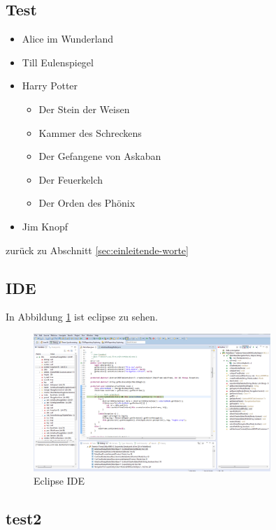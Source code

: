 \documentclass[12pt]{scrartcl}
\begin{document}
\subsection{Test}

\begin{itemize}
  \item Alice im Wunderland
  \item Till Eulenspiegel
  \item Harry Potter
  \begin{itemize}
    \item Der Stein der Weisen
    \item Kammer des Schreckens
    \item Der Gefangene von Askaban
    \item Der Feuerkelch
    \item Der Orden des Phönix
  \end{itemize}
  \item Jim Knopf
\end{itemize}

zurück zu Abschnitt \ref{sec:einleitende-worte}

\subsection{IDE}

In Abbildung \ref{fig:eclipse-ide} ist eclipse zu sehen.

\begin{figure}[!ht]
	\centering
	\includegraphics[width=0.8\textwidth]{images/eclipse1}	
	\caption{Eclipse IDE}
	\label{fig:eclipse-ide}
\end{figure}



\subsection{test2}
\end{document}
